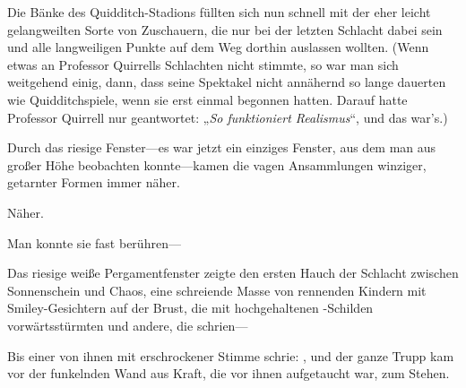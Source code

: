 Die Bänke des Quidditch-Stadions füllten sich nun schnell mit der eher leicht gelangweilten Sorte von Zuschauern, die nur bei der letzten Schlacht dabei sein und alle langweiligen Punkte auf dem Weg dorthin auslassen wollten. (Wenn etwas an Professor Quirrells Schlachten nicht stimmte, so war man sich weitgehend einig, dann, dass seine Spektakel nicht annähernd so lange dauerten wie Quidditchspiele, wenn sie erst einmal begonnen hatten. Darauf hatte Professor Quirrell nur geantwortet: „\emph{So funktioniert Realismus}“, und das war’s.)

Durch das riesige Fenster—es war jetzt ein einziges Fenster, aus dem man aus großer Höhe beobachten konnte—kamen die vagen Ansammlungen winziger, getarnter Formen immer näher.

Näher.

Man konnte sie fast berühren—

\later

Das riesige weiße Pergamentfenster zeigte den ersten Hauch der Schlacht zwischen Sonnenschein und Chaos, eine schreiende Masse von rennenden Kindern mit Smiley-Gesichtern auf der Brust, die mit hochgehaltenen -Schilden vorwärtsstürmten und andere, die  schrien—

Bis einer von ihnen mit erschrockener Stimme schrie: , und der ganze Trupp kam vor der funkelnden Wand aus Kraft, die vor ihnen aufgetaucht war, zum Stehen.

